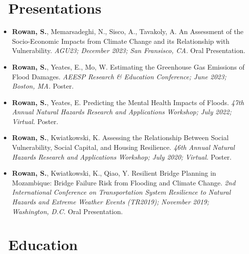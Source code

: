 \documentclass[11pt,a4paper,]{sr-awesome-cv}
\begin{document}
\normalsize

\hypertarget{presentations}{%
\section{\faUser~Presentations}\label{presentations}}

\footnotesize

\begin{itemize}
\item
  \textbf{Rowan, S.}, Memarsadeghi, N., Sisco, A., Tavakoly, A. An
  Assessment of the Socio-Economic Impacts from Climate Change and its
  Relationship with Vulnerability. \emph{AGU23; December 2023; San
  Fransisco, CA.} Oral Presentation.
\item
  \textbf{Rowan, S.}, Yeates, E., Mo, W. Estimating the Greenhouse Gas
  Emissions of Flood Damages. \emph{AEESP Research \& Education
  Conference; June 2023; Boston, MA.} Poster.
\item
  \textbf{Rowan, S.}, Yeates, E. Predicting the Mental Health Impacts of
  Floods. \emph{47th Annual Natural Hazards Research and Applications
  Workshop; July 2022; Virtual.} Poster.
\item
  \textbf{Rowan, S.}, Kwiatkowski, K. Assessing the Relationship Between
  Social Vulnerability, Social Capital, and Housing Resilience.
  \emph{46th Annual Natural Hazards Research and Applications Workshop;
  July 2020; Virtual.} Poster.
\item
  \textbf{Rowan, S.}, Kwiatkowski, K., Qiao, Y. Resilient Bridge
  Planning in Mozambique: Bridge Failure Risk from Flooding and Climate
  Change. \emph{2nd International Conference on Transportation System
  Resilience to Natural Hazards and Extreme Weather Events (TR2019);
  November 2019; Washington, D.C.} Oral Presentation.
\end{itemize}

\normalsize

\hypertarget{education}{%
\section{\faMortarBoard~Education}\label{education}}

\begin{cventries}
    \vspace{-4.0mm}
\end{cventries}
\end{document}
